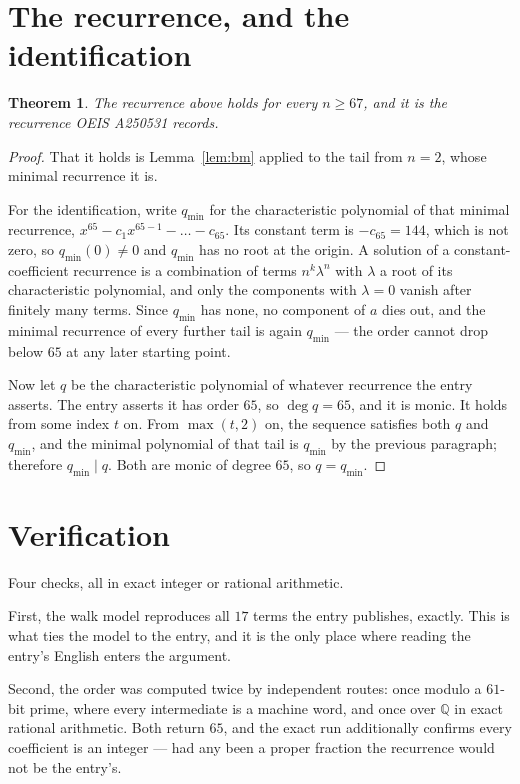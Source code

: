 \documentclass[11pt,a4paper]{article}
\theoremstyle{plain}
\newtheorem{theorem}{Theorem}
\theoremstyle{definition}
\begin{document}
\section{The recurrence, and the identification}

\begin{theorem}
The recurrence above holds for every $n\ge67$, and it is the recurrence OEIS A250531 records.
\end{theorem}

\begin{proof}
That it holds is Lemma~\ref{lem:bm} applied to the tail from $n=2$, whose minimal
recurrence it is.

For the identification, write $q_{\min}$ for the characteristic polynomial of that minimal
recurrence, $x^{65}-c_1x^{65-1}-\dots-c_{65}$. Its constant term is
$-c_{65}=144$, which is not zero, so $q_{\min}(0)\neq0$ and $q_{\min}$ has no
root at the origin. A solution of a constant-coefficient recurrence is a combination of terms
$n^{k}\lambda^{n}$ with $\lambda$ a root of its characteristic polynomial, and only the
components with $\lambda=0$ vanish after finitely many terms. Since $q_{\min}$ has none, no
component of $a$ dies out, and the minimal recurrence of every further tail is again
$q_{\min}$ --- the order cannot drop below $65$ at any later starting point.

Now let $q$ be the characteristic polynomial of whatever recurrence the entry asserts. The
entry asserts it has order $65$, so $\deg q=65$, and it is monic. It holds from some
index $t$ on. From $\max(t,2)$ on, the sequence satisfies both $q$ and $q_{\min}$, and
the minimal polynomial of that tail is $q_{\min}$ by the previous paragraph; therefore
$q_{\min}\mid q$. Both are monic of degree $65$, so $q=q_{\min}$.
\end{proof}

\section{Verification}

Four checks, all in exact integer or rational arithmetic.

First, the walk model reproduces all $17$ terms the entry publishes, exactly. This is
what ties the model to the entry, and it is the only place where reading the entry's English
enters the argument.

Second, the order was computed twice by independent routes: once modulo a $61$-bit prime, where
every intermediate is a machine word, and once over $\mathbb{Q}$ in exact rational arithmetic.
Both return $65$, and the exact run additionally confirms every coefficient is an integer
--- had any been a proper fraction the recurrence would not be the entry's.
\end{document}
